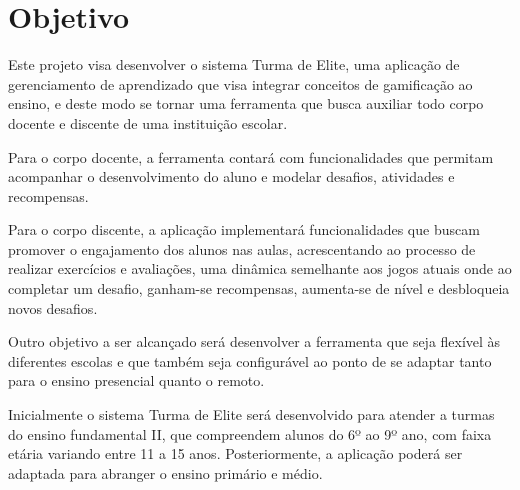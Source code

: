 \chapter{Objetivo}
Este projeto visa desenvolver o sistema Turma de Elite, uma aplicação de gerenciamento de aprendizado que visa integrar conceitos de gamificação ao ensino, e deste modo se tornar uma ferramenta que busca auxiliar todo corpo docente e discente de uma instituição escolar.

Para o corpo docente, a ferramenta contará com funcionalidades que permitam acompanhar o desenvolvimento do aluno e modelar desafios, atividades e recompensas.

Para o corpo discente, a aplicação implementará funcionalidades que buscam promover o engajamento dos alunos nas aulas, acrescentando ao processo de realizar exercícios e avaliações, uma dinâmica semelhante aos jogos atuais onde ao completar um desafio, ganham-se recompensas, aumenta-se de nível e desbloqueia novos desafios.

Outro objetivo a ser alcançado será desenvolver a ferramenta que seja flexível às diferentes escolas e que também seja configurável ao ponto de se adaptar tanto para o ensino presencial quanto o remoto. 

Inicialmente o sistema Turma de Elite será desenvolvido para atender a turmas do ensino fundamental II, que compreendem alunos do 6º ao 9º ano, com faixa etária variando entre 11 a 15 anos. Posteriormente, a aplicação poderá ser adaptada para abranger o ensino primário e médio.